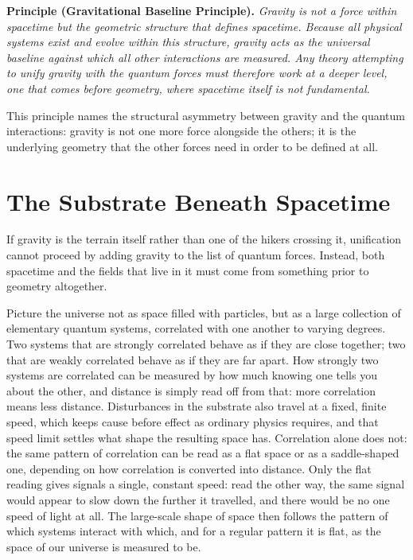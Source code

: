 \documentclass[12pt]{article}
\begin{document}
\textbf{Principle (Gravitational Baseline Principle).}
\emph{Gravity is not a force within spacetime but the geometric structure that defines spacetime. Because all physical systems exist and evolve within this structure, gravity acts as the universal baseline against which all other interactions are measured. Any theory attempting to unify gravity with the quantum forces must therefore work at a deeper level, one that comes before geometry, where spacetime itself is not fundamental.}

This principle names the structural asymmetry between gravity and the quantum interactions: gravity is not one more force alongside the others; it is the underlying geometry that the other forces need in order to be defined at all.

\section{The Substrate Beneath Spacetime}

If gravity is the terrain itself rather than one of the hikers crossing it, unification cannot proceed by adding gravity to the list of quantum forces. Instead, both spacetime and the fields that live in it must come from something prior to geometry altogether.

Picture the universe not as space filled with particles, but as a large collection of elementary quantum systems, correlated with one another to varying degrees. Two systems that are strongly correlated behave as if they are close together; two that are weakly correlated behave as if they are far apart. How strongly two systems are correlated can be measured by how much knowing one tells you about the other, and distance is simply read off from that: more correlation means less distance. Disturbances in the substrate also travel at a fixed, finite speed, which keeps cause before effect as ordinary physics requires, and that speed limit settles what shape the resulting space has. Correlation alone does not: the same pattern of correlation can be read as a flat space or as a saddle-shaped one, depending on how correlation is converted into distance. Only the flat reading gives signals a single, constant speed: read the other way, the same signal would appear to slow down the further it travelled, and there would be no one speed of light at all. The large-scale shape of space then follows the pattern of which systems interact with which, and for a regular pattern it is flat, as the space of our universe is measured to be.
\end{document}
